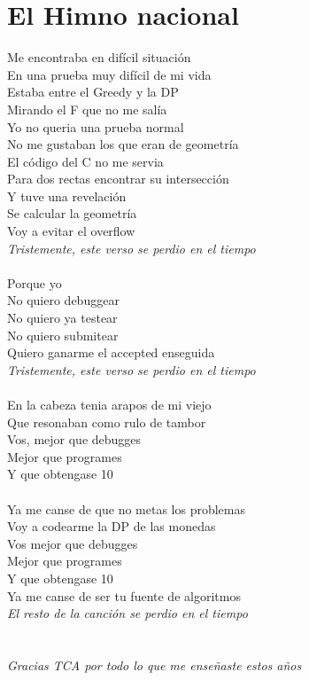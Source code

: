 \documentclass[10pt, landscape, twocolumn, a4paper, notitlepage]{article}
\begin{document}
\section{El Himno nacional}
Me encontraba en dif\'icil situaci\'on\\
En una prueba muy dif\'icil de mi vida \\
Estaba entre el Greedy y la DP \\
Mirando el F que no me sal\'ia  \\
Yo no queria una prueba normal \\
No me gustaban los que eran de geometr\'ia \\
El c\'odigo del C no me servia \\
Para dos rectas encontrar su intersecci\'on \\
Y tuve una revelaci\'on \\
Se calcular la geometr\'ia \\
Voy a evitar el overflow \\
\textit{Tristemente, este verso se perdio en el tiempo} \\
\\
Porque yo \\
No quiero debuggear \\
No quiero ya testear \\
No quiero submitear \\
Quiero ganarme el accepted enseguida \\
\textit{Tristemente, este verso se perdio en el tiempo} \\
\\
En la cabeza tenia arapos de mi viejo \\
Que resonaban como rulo de tambor \\
Vos, mejor que debugges \\
Mejor que programes \\
Y que obtengase 10 \\
\\
Ya me canse de que no metas los problemas \\
Voy a codearme la DP de las monedas \\
Vos mejor que debugges \\
Mejor que programes \\
Y que obtengase 10 \\
Ya me canse de ser tu fuente de algoritmos \\
\textit{El resto de la canci\'on se perdio en el tiempo} \\
\\
\\
\textit{Gracias TCA por todo lo que me enseñaste estos años} \\
\newpage
\end{document}
